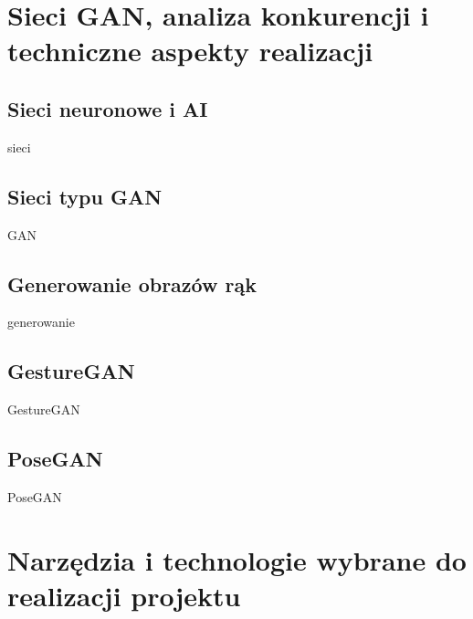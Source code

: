 \documentclass[12pt]{article}
\begin{document}
\begin{sloppypar}
\section{Sieci GAN, analiza konkurencji i techniczne aspekty realizacji}
{
  \subsection{Sieci neuronowe i AI}
  {
    sieci
  }
  \subsection{Sieci typu GAN}
  {
    GAN
  }
  \subsection{Generowanie obrazów rąk}
  {
    generowanie
  }
  \subsection{GestureGAN}
  {
    GestureGAN
  }
  \subsection{PoseGAN}
  {
    PoseGAN
  }
}

\section{Narzędzia i technologie wybrane do realizacji projektu}
{
}
\end{sloppypar}
\end{document}

